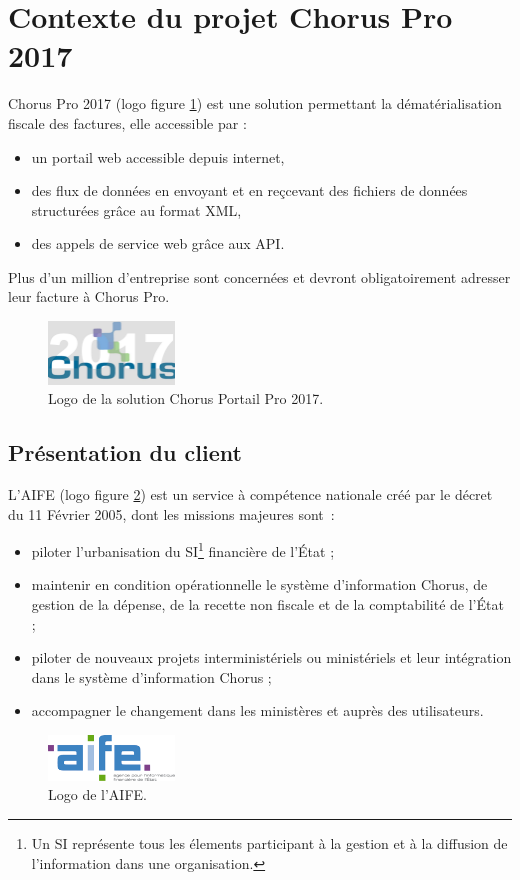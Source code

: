 \documentclass[12pt,a4paper]{article}
\begin{document}
\section{Contexte du projet Chorus Pro 2017}
Chorus Pro 2017 (logo figure \ref{logoCpp}) est une solution  permettant la dématérialisation fiscale des factures, elle accessible par :
\begin{itemize}
\item un portail web accessible depuis internet,
\item des flux de données en envoyant et en reçcevant des fichiers de données structurées grâce au format \gls{XML},
\item des appels de service web grâce aux \gls{API}.
\end{itemize}
Plus d'un million d'entreprise sont concernées et devront obligatoirement adresser leur facture à Chorus Pro.
\begin{figure}[H]
	\begin{center}
		\includegraphics[width=0.3\textwidth, height=\textheight, keepaspectratio]{cpp2017.png}
		\caption{Logo de la solution Chorus Portail Pro 2017.}
		\label{logoCpp}
	\end{center}
\end{figure}
\subsection{Présentation du client}
L'AIFE (logo figure \ref{logoAife}) est un service à compétence nationale créé par le décret du 11 Février 2005, dont les missions majeures sont~:
\begin{itemize}
\item piloter l’urbanisation du \gls{SI}\footnote{Un SI représente tous les élements participant à la gestion et à la diffusion de l'information dans une organisation.} financière de l’État ;
\item maintenir en condition opérationnelle le système d’information Chorus, de gestion de la dépense, de la recette non fiscale et de la comptabilité de l’État ;
\item piloter de nouveaux projets interministériels ou ministériels et leur intégration dans le système d’information Chorus ;
\item accompagner le changement dans les ministères et auprès des utilisateurs.
\end{itemize}
\begin{figure}[H]
\begin{center}
\includegraphics[width=0.3\textwidth, height=\textheight, keepaspectratio]{aifedef.png}
\caption{Logo de l'AIFE.}
\label{logoAife}
\end{center}
\end{figure}
\newpage
\end{document}
